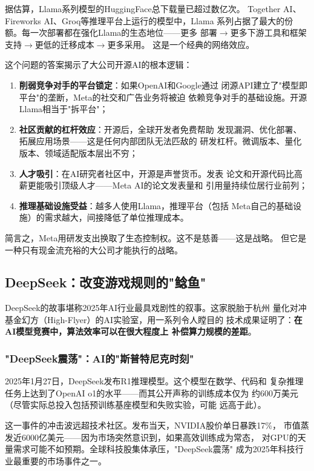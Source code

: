 据估算，Llama系列模型的HuggingFace总下载量已超过数亿次。
Together AI、Fireworks AI、Groq等推理平台上运行的模型中，Llama
系列占据了最大的份额。每一次部署都在强化Llama的生态地位——更多
部署$\to$更多下游工具和框架支持$\to$更低的迁移成本$\to$更多采用。
这是一个经典的网络效应。

\begin{whybox}
这个问题的答案揭示了大公司开源AI的根本逻辑：
\begin{enumerate}
  \item \textbf{削弱竞争对手的平台锁定}：如果OpenAI和Google通过
    闭源API建立了"模型即平台"的垄断，Meta的社交和广告业务将被迫
    依赖竞争对手的基础设施。开源Llama相当于"拆平台"；
  \item \textbf{社区贡献的杠杆效应}：开源后，全球开发者免费帮助
    发现漏洞、优化部署、拓展应用场景——这是任何内部团队无法匹敌的
    研发杠杆。微调版本、量化版本、领域适配版本层出不穷；
  \item \textbf{人才吸引}：在AI研究者社区中，开源是声誉货币。发表
    论文和开源代码比高薪更能吸引顶级人才——Meta AI的论文发表量和
    引用量持续位居行业前列；
  \item \textbf{推理基础设施受益}：越多人使用Llama，推理平台（包括
    Meta自己的基础设施）的需求越大，间接降低了单位推理成本。
\end{enumerate}
简言之，Meta用研发支出换取了生态控制权。这不是慈善——这是战略。
但它是一种只有现金流充裕的大公司才能执行的战略。
\end{whybox}

\subsection{DeepSeek：改变游戏规则的"鲶鱼"}
\label{subsec:deepseek-open}

DeepSeek的故事堪称2025年AI行业最具戏剧性的叙事。这家脱胎于杭州
量化对冲基金幻方（High-Flyer）的AI实验室，用一系列令人瞠目的
技术成果证明了：\textbf{在AI模型竞赛中，算法效率可以在很大程度上
补偿算力规模的差距}。

\subsubsection{"DeepSeek震荡"：AI的"斯普特尼克时刻"}
2025年1月27日，DeepSeek发布R1推理模型。这个模型在数学、代码和
复杂推理任务上达到了OpenAI o1的水平——而其公开声称的训练成本仅为
约600万美元（尽管实际总投入包括预训练基座模型和失败实验，可能
远高于此）。

这一事件的冲击波远超技术社区。发布当天，NVIDIA股价单日暴跌17\%，
市值蒸发近6000亿美元——因为市场突然意识到，如果高效训练成为常态，
对GPU的天量需求可能不如预期。全球科技股集体承压，"DeepSeek震荡"
成为2025年科技行业最重要的市场事件之一。


